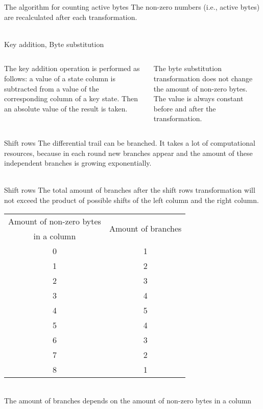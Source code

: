 \documentclass[10pt]{beamer}
\begin{document}
\begin{frame}{The algorithm for counting active bytes}
The non-zero numbers (i.e., active bytes) are recalculated after each transformation. \\
\\
\end{frame}

\begin{frame}{Key addition, Byte substitution}
\begin{columns}
\begin{column}{0.5\textwidth}
The \alert{key addition} operation is performed as follows: a value of a state column is subtracted from a value of the corresponding column of a key state. Then an absolute value of the result is taken. 
\end{column}
\pause
\begin{column}{0.5\textwidth}
The \alert{byte substitution} transformation does not change the amount of non-zero bytes. The value is always constant before and after the transformation.
\end{column}
\end{columns}
\end{frame}

\begin{frame}{Shift rows}
The differential trail can be branched. It takes a lot of computational resources, because in each round new branches appear and the amount of these independent branches is growing exponentially. \\
\\
\end{frame}

\begin{frame}{Shift rows}
The total amount of branches after the shift rows transformation will not exceed the product of possible shifts of the left column and the right column. \\
\begin{tabular}{|c|c|}
\hline
Amount of non-zero bytes & \multirow{2}{*}{Amount of branches} \\
in a column & \\ \hline
0 & 1 \\ \hline
1 & 2 \\ \hline
2 & 3 \\ \hline
3 & 4 \\ \hline
4 & 5 \\ \hline
5 & 4 \\ \hline
6 & 3 \\ \hline
7 & 2 \\ \hline
8 & 1 \\ \hline
\end{tabular}
\\
\scriptsize{The amount of branches depends on the amount of non-zero bytes in a column}
\end{frame}
\end{document}
